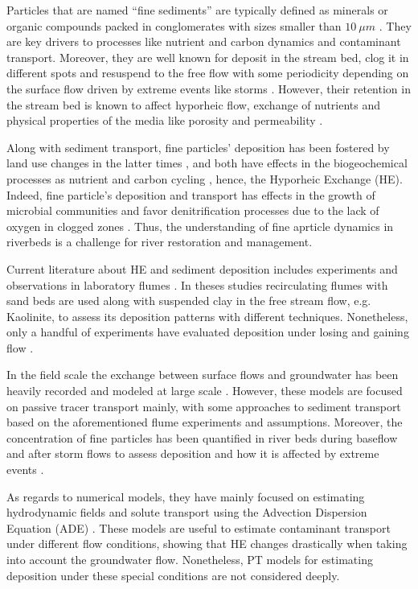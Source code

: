 \documentclass[draft,linenumbers]{agujournal2018}
\begin{document}
Particles that are named ``fine sediments'' are typically defined as minerals or organic compounds packed in conglomerates with sizes smaller than $10 \ \mu m$ \citep{Drummond2014,Drummond2018}. They are key drivers to processes like nutrient and carbon dynamics and contaminant transport. Moreover, they are well known for deposit in the stream bed, clog it in different spots \citep{Brunke1999} and resuspend to the free flow with some periodicity \citep{Drummond2015} depending on the surface flow driven by extreme events like storms \citep{Drummond2017}. However, their retention in the stream bed is known to affect hyporheic flow, exchange of nutrients and physical properties of the media like porosity and permeability \citep{Crenshaw2002,Mendoza2017}. 

Along with sediment transport, fine particles' deposition has been fostered by land use changes in the latter times \citep{Wohl2015}, and both have effects in the biogeochemical processes as nutrient and carbon cycling \citep{Hope1994,Gottselig2014}, hence, the Hyporheic Exchange (HE). Indeed, fine particle's deposition and transport has effects in the growth of microbial communities and favor denitrification processes due to the lack of oxygen in clogged zones \citep{Navel2011}. Thus, the understanding of fine aprticle dynamics in riverbeds is a challenge for river restoration and management. 

Current literature about HE and sediment deposition includes experiments and observations in laboratory flumes \citep{Elliott1997b,Marion2002,Salehin2004a}. In theses studies recirculating flumes with sand beds are used along with suspended clay in the free stream flow, e.g. Kaolinite, to assess its deposition patterns with different techniques. Nonetheless, only a handful of experiments have evaluated deposition under losing and gaining flow \citep{Fox2014,Fox2018}. 

In the field scale the exchange between surface flows and groundwater has been heavily recorded and modeled at large scale \citep{Woessner2000a,Cardenas2004}. However, these models are focused on passive tracer transport mainly, with some approaches to sediment transport based on the aforementioned flume experiments and assumptions. Moreover, the concentration of fine particles has been quantified in river beds during baseflow and after storm flows to assess deposition and how it is affected by extreme events \citep{Drummond2017}. 


As regards to numerical models, they have mainly focused on estimating hydrodynamic fields and solute transport using the Advection Dispersion Equation (ADE) \citep{Cardenas2006,Cardenas2007f,Cardenas2007b,Boano2007b,BayaniCardenas2008c,Trauth2013}. These models are useful to estimate contaminant transport under different flow conditions, showing that HE changes drastically when taking into account the groundwater flow.  Nonetheless, PT models for estimating deposition under these special conditions are not considered deeply. 
\end{document}
